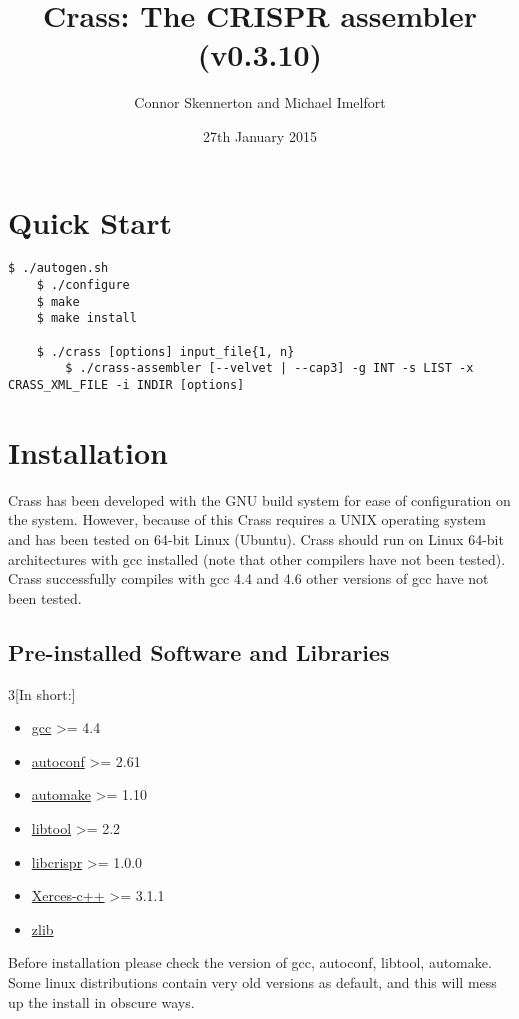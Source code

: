 \documentclass[11pt]{article} %
\title{Crass:  The CRISPR assembler (v0.3.10)}
\author{Connor Skennerton and Michael Imelfort}
\date{27th January 2015} %
\newenvironment{warning}
  {\par\vspace{0.3cm}\begin{mdframed}[linewidth=2pt,linecolor=red]%
    \begin{list}{}{\leftmargin=1cm}
\sffamily\item[\color{red}\ding{43}]}
  {\end{list}\end{mdframed}\par\vspace{0.3cm}}
\begin{document}
\maketitle

\tableofcontents
\newpage
\section{Quick Start}
\begin{lstlisting}[style=BashInputStyle]
	$ ./autogen.sh
	$ ./configure
	$ make
	$ make install
	
	$ ./crass [options] input_file{1, n}
        $ ./crass-assembler [--velvet | --cap3] -g INT -s LIST -x CRASS_XML_FILE -i INDIR [options]
\end{lstlisting}
\section{Installation}
Crass has been developed with the GNU build system for ease of configuration on the system.  However, because of this Crass requires a UNIX operating system and has been tested on 64-bit Linux (Ubuntu).  Crass should run on Linux 64-bit architectures with gcc installed (note that other compilers have not been tested).  Crass successfully compiles with gcc 4.4 and 4.6 other versions of gcc have not been tested.    

\subsection{Pre-installed Software and Libraries}
\begin{multicols}{3}[In short:]
\begin{itemize}
\item \href{http://gcc.gnu.org/}{gcc} \textgreater= 4.4
\item \href{http://www.gnu.org/software/autoconf/}{autoconf}  \textgreater= 2.61
\item \href{http://www.gnu.org/software/automake/}{automake} \textgreater= 1.10
\item \href{http://www.gnu.org/software/libtool/}{libtool} \textgreater= 2.2
\item \href{http://ctskennerton.github.com/libcrispr}{libcrispr} \textgreater= 1.0.0
\item \href{http://xerces.apache.org/}{Xerces-c++} \textgreater= 3.1.1
\item \href{http://zlib.net/}{zlib}
\end{itemize}
\end{multicols}
\begin{warning}
 Before installation please check the version of gcc, autoconf, libtool, automake. Some linux distributions contain very old versions as default, and this will mess up the install in obscure ways. 
\end{warning}
\end{document}

